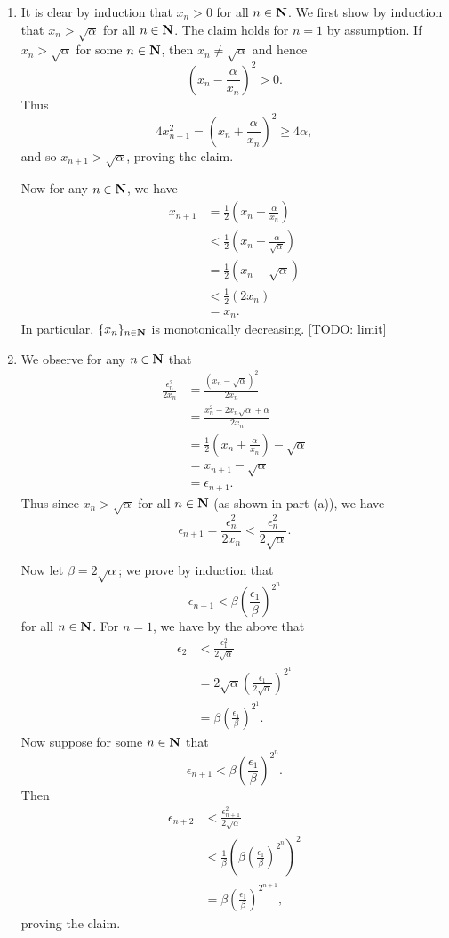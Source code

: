 \begin{ex}

\end{ex}

\begin{ex}
\begin{enumerate}
\item It is clear by induction that $x_n > 0$ for all $n \in \mathbf{N}$. We first show by induction that $x_n > \sqrt{\alpha}$ for all $n \in \mathbf{N}$. The claim holds for $n = 1$ by assumption. If $x_n > \sqrt{\alpha}$ for some $n \in \mathbf{N}$, then $x_n \not = \sqrt{\alpha}$ and hence \[\left(x_n - \frac{\alpha}{x_n}\right)^2 > 0.\] Thus \[4x_{n+1}^2 = \left(x_n + \frac{\alpha}{x_n}\right)^2 \geq 4\alpha,\] and so $x_{n+1} > \sqrt{\alpha}$, proving the claim.

Now for any $n \in \mathbf{N}$, we have
\begin{align*}
x_{n+1} & = \frac{1}{2}\left(x_n + \frac{\alpha}{x_n}\right)\\
& < \frac{1}{2}\left(x_n + \frac{\alpha}{\sqrt{\alpha}}\right)\\
& = \frac{1}{2}(x_n + \sqrt{\alpha})\\
& < \frac{1}{2}(2x_n)\\
& = x_n.
\end{align*}
In particular, $\{x_n\}_{n\in\mathbf{N}}$ is monotonically decreasing. [TODO: limit]

\item We observe for any $n \in \mathbf{N}$ that
\begin{align*}
\frac{\epsilon_n^2}{2x_n} & = \frac{(x_n - \sqrt{\alpha})^2}{2x_n}\\
& = \frac{x_n^2-2x_n\sqrt{\alpha} + \alpha}{2x_n}\\
& = \frac{1}{2}\left(x_n + \frac{\alpha}{x_n}\right) - \sqrt{\alpha}\\
& = x_{n+1} - \sqrt{\alpha}\\
& = \epsilon_{n+1}.
\end{align*}
Thus since $x_n > \sqrt{\alpha}$ for all $n \in \mathbf{N}$ (as shown in part (a)), we have \[\epsilon_{n+1} = \frac{\epsilon_n^2}{2x_n} < \frac{\epsilon_n^2}{2\sqrt{\alpha}}.\]

Now let $\beta = 2\sqrt{\alpha}$; we prove by induction that \[\epsilon_{n+1} < \beta\left(\frac{\epsilon_1}{\beta}\right)^{2^n}\] for all $n \in \mathbf{N}$. For $n = 1$, we have by the above that
\begin{align*}
\epsilon_2 & < \frac{\epsilon_1^2}{2\sqrt{\alpha}}\\
& = 2\sqrt{\alpha}\left(\frac{\epsilon_1}{2\sqrt{\alpha}}\right)^{2^1}\\
& = \beta\left(\frac{\epsilon_1}{\beta}\right)^{2^1}.
\end{align*}
Now suppose for some $n \in \mathbf{N}$ that \[\epsilon_{n+1} < \beta\left(\frac{\epsilon_1}{\beta}\right)^{2^n}.\] Then
\begin{align*}
\epsilon_{n+2} & < \frac{\epsilon_{n+1}^2}{2\sqrt{\alpha}}\\
& < \frac{1}{\beta}\left(\beta\left(\frac{\epsilon_1}{\beta}\right)^{2^n}\right)^2\\
& = \beta\left(\frac{\epsilon_1}{\beta}\right)^{2^{n+1}},
\end{align*}
proving the claim.


\end{enumerate}
\end{ex}
